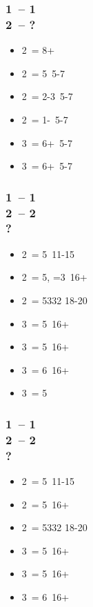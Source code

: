 \subsubsection*{1\spades\ -- 1\ntx\ \\ 2\clubs\ -- ?}
\begin{itemize}
    \item 2\diams\ = 8+
    \item 2\hearts\ = 5\hearts\ 5-7
    \item 2\spades\ = 2-3\spades\ 5-7
    \item 2\ntx\ = 1-\spades\ 5-7
    \item 3\clubs\ = 6+\clubs\ 5-7
    \item 3\diams\ = 6+\diams\ 5-7
\end{itemize}

\subsubsection*{1\hearts\ -- 1\spades\ \\ 2\clubs\ -- 2\diams \\ ?}
\begin{itemize}
    \item 2\hearts\ = 5\clubs\ 11-15
    \item 2\spades\ = 5\hearts, =3\spades\ 16+
    \item 2\ntx\ = 5332 18-20
    \item 3\clubs\ = 5\clubs\ 16+
    \item 3\diams\ = 5\diams\ 16+
    \item 3\hearts\ = 6\hearts\ 16+
    \item 3\spades\ = 5\spades\ \gf
\end{itemize}

\subsubsection*{1\hearts\ -- 1\ntx\ \\ 2\clubs\ -- 2\diams \\ ?}
\begin{itemize}
    \item 2\hearts\ = 5\clubs\ 11-15
    \item 2\spades\ = 5\spades\ 16+
    \item 2\ntx\ = 5332 18-20
    \item 3\clubs\ = 5\clubs\ 16+
    \item 3\diams\ = 5\diams\ 16+
    \item 3\hearts\ = 6\hearts\ 16+
\end{itemize}

